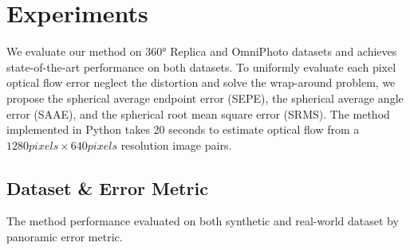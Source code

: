 \section{Experiments}
\label{sec:exp}

We evaluate our method on 360° Replica\cite{StrauWMCWGEMRVCYBYPYZLCBGMPSBSNGLN2019} and OmniPhoto\cite{BerteYLR2020} datasets and achieves state-of-the-art performance on both datasets.
%
To uniformly evaluate each pixel optical flow error neglect the distortion and solve the wrap-around problem, we propose the spherical average endpoint error (SEPE), the spherical average angle error (SAAE), and the spherical root mean square error  (SRMS).
%
The method implemented in Python takes 20 seconds to estimate optical flow from a $1280 pixels\times640 pixels$ resolution image pairs.

\subsection{Dataset \& Error Metric}

The method performance evaluated on both synthetic and real-world dataset by panoramic error metric.

